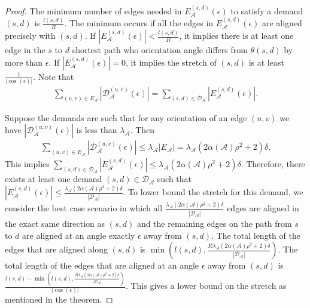 \documentclass[10pt,a4paper]{amsart}
\begin{document}
\begin{proof}
The minimum number of edges needed in $E_\mathcal{A}^{(s,d)}(\epsilon)$  to satisfy a demand $(s, d)$ is $\frac{l(s,d)}{ R }$.
The minimum occurs if all the edges in $E_\mathcal{A}^{(s,d)}(\epsilon)$ are aligned precisely with $(s, d)$.
If $|E_\mathcal{A}^{(s,d)}(\epsilon)| < \frac{l(s,d)}{R}$, it implies there is at least one edge in the $s$ to $d$ shortest path who orientation angle differs from $\theta(s,d)$ by more than $\epsilon$. 
If $|E_\mathcal{A}^{(s,d)}(\epsilon)| = 0$, it implies the stretch of $(s, d)$ is at least $\frac{1}{ |\cos(\epsilon)| }$.  
Note that 
\begin{align}
\sum_{(u, v) \in E_\mathcal{A}} | \mathcal{D}_\mathcal{A}^{(u,v)}(\epsilon) | = \sum_{(s, d) \in \hat{\mathcal{D}}_\mathcal{A}} | E_\mathcal{A}^{(s, d)}(\epsilon)|.
\end{align}   

Suppose the demands are such that for any orientation of an edge $(u, v)$ we have $|\mathcal{D}_\mathcal{A}^{(u,v)}(\epsilon)|$ is less than $\lambda_\mathcal{A}$. 
Then 
\begin{align}
\sum_{(u, v) \in E_\mathcal{A}} | \mathcal{D}_\mathcal{A}^{(u,v)}(\epsilon) | \leq \lambda_\mathcal{A} |E_\mathcal{A}| = \lambda_\mathcal{A} (2\alpha(\mathcal{A}) \rho^2 + 2) \delta.
\end{align} 
This implies  $\sum_{(s, d) \in \mathcal{D}_\mathcal{A}} | E_\mathcal{A}^{(s, d)}(\epsilon)| \leq \lambda_\mathcal{A} (2\alpha(\mathcal{A}) \rho^2 + 2) \delta$.  
Therefore, there exists at least one demand $(s, d) \in \mathcal{D}_\mathcal{A}$ such that $|E_\mathcal{A}^{(s,d)}(\epsilon)| \leq \frac{\lambda_\mathcal{A} (2\alpha(\mathcal{A}) \rho^2 + 2) \delta}{ |\mathcal{D}_\mathcal{A}| }$.
To lower bound the stretch for this demand, we consider the best case scenario in which all $\frac{\lambda_\mathcal{A} (2\alpha(\mathcal{A}) \rho^2 + 2) \delta}{ |\mathcal{D}_\mathcal{A}| }$ edges are aligned in the exact same direction as $(s,d)$ and the remaining edges on the path from $s$ to $d$ are aligned at an angle exactly $\epsilon$ away from $(s,d)$.  
The total length of the edges that are aligned along $(s,d)$ is $ \min \left(l(s,d), \frac{R \lambda_\mathcal{A} (2\alpha(\mathcal{A}) \rho^2 + 2) \delta}{ |\mathcal{D}_\mathcal{A}|} \right) $.  
The total length of the edges that are aligned at an angle $\epsilon$ away from $(s,d)$ is $\frac{l(s,d) -   \min \left(l(s,d), \frac{R \lambda_\mathcal{A} (2 \alpha(\mathcal{A}) \rho^2 + 2) \delta}{ |\mathcal{D}_\mathcal{A}|} \right)}{|\cos(\epsilon)|}$.  
This gives a lower bound on the stretch as mentioned in the theorem.  
\end{proof} 
\end{document}
